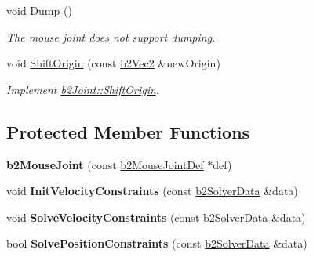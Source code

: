 \begin{DoxyCompactItemize}
\item 
void \hyperlink{classb2_mouse_joint_ae3d3a46a0032c0e50f346e7f7129617f}{Dump} ()\hypertarget{classb2_mouse_joint_ae3d3a46a0032c0e50f346e7f7129617f}{}\label{classb2_mouse_joint_ae3d3a46a0032c0e50f346e7f7129617f}

\begin{DoxyCompactList}\small\item\em The mouse joint does not support dumping. \end{DoxyCompactList}\item 
void \hyperlink{classb2_mouse_joint_aa3c46b204aea79822dd6c6843c361801}{Shift\+Origin} (const \hyperlink{structb2_vec2}{b2\+Vec2} \&new\+Origin)\hypertarget{classb2_mouse_joint_aa3c46b204aea79822dd6c6843c361801}{}\label{classb2_mouse_joint_aa3c46b204aea79822dd6c6843c361801}

\begin{DoxyCompactList}\small\item\em Implement \hyperlink{classb2_joint_a7804f649e993dc0fd9ae47fde5601f90}{b2\+Joint\+::\+Shift\+Origin}. \end{DoxyCompactList}\end{DoxyCompactItemize}
\subsection*{Protected Member Functions}
\begin{DoxyCompactItemize}
\item 
{\bfseries b2\+Mouse\+Joint} (const \hyperlink{structb2_mouse_joint_def}{b2\+Mouse\+Joint\+Def} $\ast$def)\hypertarget{classb2_mouse_joint_ad147d7989d884952c3389f7e5e3acf68}{}\label{classb2_mouse_joint_ad147d7989d884952c3389f7e5e3acf68}

\item 
void {\bfseries Init\+Velocity\+Constraints} (const \hyperlink{structb2_solver_data}{b2\+Solver\+Data} \&data)\hypertarget{classb2_mouse_joint_a81fbb58a52c3cea00fb25817d04d16e6}{}\label{classb2_mouse_joint_a81fbb58a52c3cea00fb25817d04d16e6}

\item 
void {\bfseries Solve\+Velocity\+Constraints} (const \hyperlink{structb2_solver_data}{b2\+Solver\+Data} \&data)\hypertarget{classb2_mouse_joint_a94efc95b4ab292d1cc193c6edbb362a2}{}\label{classb2_mouse_joint_a94efc95b4ab292d1cc193c6edbb362a2}

\item 
bool {\bfseries Solve\+Position\+Constraints} (const \hyperlink{structb2_solver_data}{b2\+Solver\+Data} \&data)\hypertarget{classb2_mouse_joint_a990ed3aaa5092ab92180b8ec3c3df342}{}\label{classb2_mouse_joint_a990ed3aaa5092ab92180b8ec3c3df342}

\end{DoxyCompactItemize}
